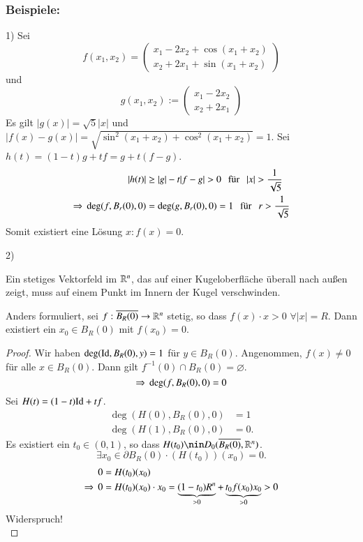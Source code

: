 \subsubsection*{Beispiele:}
\begin{description}
    \item{1)}
    Sei 
    \[
        f(x_1,x_2)=\begin{pmatrix} x_1-2x_2+\cos(x_1+x_2)\\x_2+2x_1+\sin(x_1+x_2) \end{pmatrix}
    \]
    und
    \[
        g(x_1,x_2):=\begin{pmatrix} x_1-2x_2 \\ x_2+2x_1 \end{pmatrix}
    \]
    Es gilt $|g(x)|=\sqrt{5} |x|$ und $|f(x)-g(x)|=\sqrt{\sin^2(x_1+x_2)+\cos^2(x_1+x_2)}=1$.
    Sei $h(t)=(1-t)g+tf=g+t(f-g)$.
    \begin{align*}
        |h(t)|&\geq |g|-t|f-g|>0 \qq \text{für} \qq |x|>\frac1{\sqrt{5}}\\
        \Ra \, \deg(f,B_r(0),0)&= \deg(g,B_r(0),0)=1 \qq \text{für} \qq r>\frac1{\sqrt{5}}
    \end{align*}
    Somit existiert eine Lösung $x:f(x)=0$.

    \item{2)}
    \begin{theorem}
        Ein stetiges Vektorfeld im $\mathbb{R}^n$, das auf einer Kugeloberfläche überall nach außen zeigt, muss
        auf einem Punkt im Innern der Kugel verschwinden. 
        
        Anders formuliert, sei $f:\overline{B_R(0)} \rightarrow \mathbb{R}^n$ stetig, so dass $f(x)\cdot x>0$ $\forall |x|=R$. 
        Dann existiert ein $x_0\in B_R(0)$ mit $f(x_0)=0$.
    \end{theorem}

    \begin{proof}
        Wir haben $\deg(\mathrm{Id}, B_R(0),y)=1$ für $y\in B_R(0)$. Angenommen, $f(x)\neq 0$ für alle
        $x\in B_R(0)$. Dann gilt $f^{-1}(0)\cap B_R(0)=\varnothing$.
        \[
            \Rightarrow \, \deg(f,B_R(0),0)=0
        \]
        Sei $H(t)=(1-t)\mathrm{Id}+tf$.
        \begin{align*}
            \deg(H(0),B_R(0),0)&=1\\
            \deg(H(1),B_R(0),0)&=0.
        \end{align*}
        Es existiert ein $t_0\in (0,1)$, so dass $H(t_0)\nin D_0(\ol{B_R(0)},\R^n)$.
        \[
            \exists x_0\in \partial B_R(0)\cdot (H(t_0))(x_0)=0.
        \]
        \begin{align*}
            0&=H(t_0)(x_0)\\
            \Rightarrow \, 0&= H(t_0)(x_0)\cdot x_0= \underbrace{(1-t_0)R^n}_{>0}+\underbrace{t_0f(x_0)x_0}_{>0}
            >0
        \end{align*}
        Widerspruch!
        \[ \]
    \end{proof}
\end{description}

